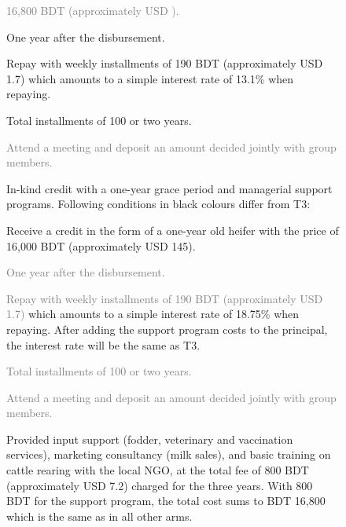 \begin{figure}
{{\begin{description}
		\begin{description}
		\vspace{1ex}\setlength{\itemsep}{.5ex}\setlength{\baselineskip}{8pt}
		\item[\textcolor{gray}{Credit}]	\textcolor{gray}{16,800 BDT (approximately USD ).}
		\item[Repayment start]	One year after the disbursement.
		\item[Installments]	Repay with weekly installments of 190 BDT (approximately USD 1.7) which amounts to a simple interest rate of 13.1\% when repaying.
		\item[Maturity]	Total installments of 100 or two years. 
		\item[\textcolor{gray}{Weekly obligations}]	\textcolor{gray}{Attend a meeting and deposit an amount decided jointly with group members.}
		\end{description}
	\item[T4]	In-kind credit with a one-year grace period and managerial support programs. Following conditions in black colours differ from \textsf{T3}:
		\begin{description}
		\vspace{1ex}\setlength{\itemsep}{.5ex}\setlength{\baselineskip}{8pt}
		\item[Credit]	Receive a credit in the form of a one-year old heifer with the price of 16,000 BDT (approximately USD 145).
		\item[\textcolor{gray}{Repayment start}]	\textcolor{gray}{One year after the disbursement.}
		\item[\textcolor{gray}{Installments}]	\textcolor{gray}{Repay with weekly installments of 190 BDT (approximately USD 1.7)} which amounts to a simple interest rate of 18.75\% when repaying. After adding the support program costs to the principal, the interest rate will be the same as \textsf{T3}.
		\item[\textcolor{gray}{Maturity}]	\textcolor{gray}{Total installments of 100 or two years. }
		\item[\textcolor{gray}{Weekly obligations}]	\textcolor{gray}{Attend a meeting and deposit an amount decided jointly with group members.}
		\item[Support program] 	Provided input support (fodder, veterinary and vaccination services), marketing consultancy (milk sales), and basic training on cattle rearing with the local NGO, at the total fee of 800 BDT (approximately USD 7.2) charged for the three years. With 800 BDT for the support program, the total cost sums to BDT 16,800 which is the same as in all other arms.
		\end{description}
	\end{description}
	}
}
\end{figure}

